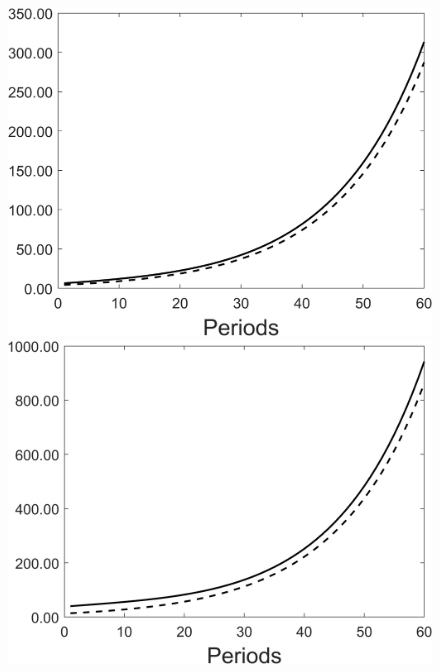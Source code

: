\begin{figure}[h!!]
\begin{minipage}[]{0.32\textwidth}
\end{minipage}
\begin{minipage}[]{0.32\textwidth}
\includegraphics[width=1\textwidth]{../codding_model/Own/figures/Rep_agent/staticRam_LF_separate_yd_periods59_eppsilon4.00_zeta1.40_Ad08_Ac04_thetac0.70_thetad0.56_HetGrowth1_tauul0.181_util0_withtarget0_lgd0.png}
\end{minipage}
\begin{minipage}[]{0.32\textwidth}
\includegraphics[width=1\textwidth]{../codding_model/Own/figures/Rep_agent/staticRam_LF_separate_xd_periods59_eppsilon4.00_zeta1.40_Ad08_Ac04_thetac0.70_thetad0.56_HetGrowth1_tauul0.181_util0_withtarget0_lgd0.png}

\end{minipage}
\end{figure}
